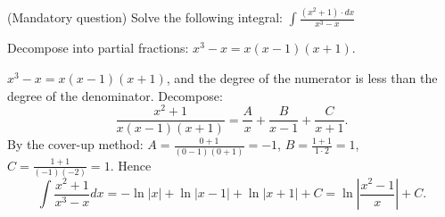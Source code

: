 
\begin{question}
(Mandatory question)
Solve the following integral:
$\displaystyle\int\frac{(x^2+1)\cdot dx}{x^3-x}$
\end{question}

\begin{hint}
Decompose into partial fractions: $x^3-x=x(x-1)(x+1)$.
\end{hint}

\begin{solution}
$x^3-x=x(x-1)(x+1)$, and the degree of the numerator is less than the degree of the denominator. Decompose:
\[ \frac{x^2+1}{x(x-1)(x+1)}=\frac{A}{x}+\frac{B}{x-1}+\frac{C}{x+1}. \]
By the cover-up method: $A=\frac{0+1}{(0-1)(0+1)}=-1$, $B=\frac{1+1}{1\cdot 2}=1$, $C=\frac{1+1}{(-1)(-2)}=1$. Hence
\[ \int\frac{x^2+1}{x^3-x}dx=-\ln|x|+\ln|x-1|+\ln|x+1|+C=\boxed{\ln\left|\frac{x^2-1}{x}\right|+C}. \]
\end{solution}
